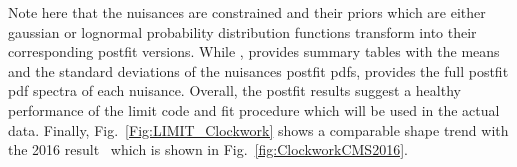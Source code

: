 Note here that the nuisances are constrained and their priors which are either gaussian or lognormal probability distribution functions transform into their corresponding postfit versions. While \COMBINE, provides summary tables with the means and the standard deviations of the nuisances postfit pdfs, \THETA provides the full postfit pdf spectra of each nuisance. Overall, the postfit results suggest a healthy performance of the limit code and fit procedure which will be used in the actual data. Finally, Fig.~\ref{Fig:LIMIT_Clockwork} shows a comparable shape trend with the 2016 result~\cite{cmsdiphoton2016} which is shown in Fig.~\ref{fig:ClockworkCMS2016}.




\begin{figure}[!htbp]{}
\end{figure}
